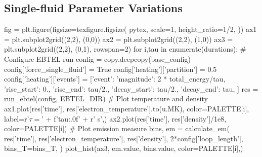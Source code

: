 \subsection{Single-fluid Parameter Variations}\label{hot-plasma:subsec:sf_par_var}

\begin{pycode}[chapter5]
fig = plt.figure(figsize=texfigure.figsize(
    pytex,
    scale=1,
    height_ratio=1/2,
))
ax1 = plt.subplot2grid((2,2), (0,0))
ax2 = plt.subplot2grid((2,2), (1,0))
ax3 = plt.subplot2grid((2,2), (0,1), rowspan=2)
for i,tau in enumerate(durations):
    # Configure EBTEL run
    config = copy.deepcopy(base_config)
    config['force_single_fluid'] = True
    config['heating']['partition'] = 0.5
    config['heating']['events'] = [{'event': {
        'magnitude': 2 * total_energy/tau,
        'rise_start': 0.,
        'rise_end': tau/2.,
        'decay_start': tau/2.,
        'decay_end': tau,
    }}]
    res = run_ebtel(config, EBTEL_DIR)
    # Plot temperature and density
    ax1.plot(res['time'], res['electron_temperature'].to(u.MK), color=PALETTE[i],
             label=r'$\tau=$' + f'{tau:.0f}' + r' \si{\second}',)
    ax2.plot(res['time'], res['density']/1e8, color=PALETTE[i])
    # Plot emission measure
    bins, em = calculate_em(
        res['time'],
        res['electron_temperature'],
        res['density'],
        2*config['loop_length'],
        bins_T=bins_T,
    )
    plot_hist(ax3, em.value, bins.value, color=PALETTE[i],)
    

\end{pycode}
